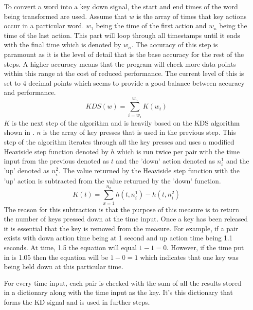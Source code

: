 \documentclass[10pt,a4paper]{report}
\begin{document}
To convert a word into a key down signal, the start and end times of the word being transformed are used. Assume that \(w\) is the array of times that key actions occur in a particular word. \(w_1\) being the time of the first action and \(w_n\) being the time of the last action. This part will loop through all timestamps until it ends with the final time which is denoted by \(w_n\). The accuracy of this step is paramount as it is the level of detail that is the base accuracy for the rest of the steps. A higher accuracy means that the program will check more data points within this range at the cost of reduced performance. The current level of this is set to 4 decimal points which seems to provide a good balance between accuracy and performance.
\begin{equation}
\textit{KDS}(w) = \sum^{w_n}_{i=w_1}K(w_i)
\end{equation}
\(K\) is the next step of the algorithm and is heavily based on the KDS algorithm shown in \cite{ToosiRamin2021Taok}. \(n\) is the array of key presses that is used in the previous step. This step of the algorithm iterates through all the key presses and uses a modified Heaviside step function denoted by \(h\) which is run twice per pair with the time input from the previous denoted as \(t\) and the 'down' action denoted as \(n_i^1\) and the 'up' denoted as \(n_i^2\). The value returned by the Heaviside step function with the 'up' action is subtracted from the value returned by the 'down' function.
\begin{equation}
\textit{K}(t) = \sum^{n_k}_{x=1}h(t,n_i^1)-h(t,n_i^2)
\end{equation}
The reason for this subtraction is that the purpose of this measure is to return the number of keys pressed down at the time input. Once a key has been released it is essential that the key is removed from the measure. For example, if a pair exists with down action time being at 1 second and up action time being 1.1 seconds. At time, 1.5 the equation will equal \(1-1=0\). However, if the time put in is 1.05 then the equation will be \(1-0=1\) which indicates that one key was being held down at this particular time.

For every time input, each pair is checked with the sum of all the results stored in a dictionary along with the time input as the key. It's this dictionary that forms the KD signal and is used in further steps.
\end{document}
